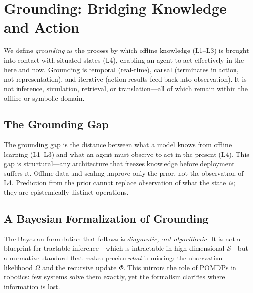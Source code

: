 \section{Grounding: Bridging Knowledge and Action}

We define \emph{grounding} as the process by which offline knowledge (L1--L3) is brought into contact with situated states (L4), enabling an agent to act effectively in the here and now. Grounding is temporal (real-time), causal (terminates in action, not representation), and iterative (action results feed back into observation). It is not inference, simulation, retrieval, or translation---all of which remain within the offline or symbolic domain.

\subsection{The Grounding Gap}

The grounding gap is the distance between what a model knows from offline learning (L1--L3) and what an agent must observe to act in the present (L4). This gap is structural---any architecture that freezes knowledge before deployment suffers it. Offline data and scaling improve only the prior, not the observation of L4. Prediction from the prior cannot replace observation of what the state \emph{is}; they are epistemically distinct operations.

\subsection{A Bayesian Formalization of Grounding}

The Bayesian formulation that follows is \emph{diagnostic, not algorithmic}. It is not a blueprint for tractable inference---which is intractable in high-dimensional \(\mathcal{S}\)---but a normative standard that makes precise \emph{what} is missing: the observation likelihood \(\Omega\) and the recursive update \(\Phi\). This mirrors the role of POMDPs in robotics: few systems solve them exactly, yet the formalism clarifies where information is lost.

